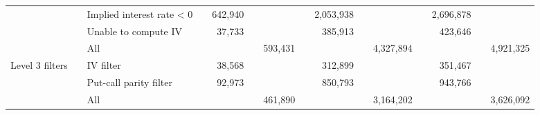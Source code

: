 \begin{tabular}{*{4}{l} *{11}{r} }
				  & & Implied interest rate < 0 & &
				642,940 & &  & &
				2,053,938 & &  & &
				2,696,878 & &  \\
			
				  & & Unable to compute IV & &
				37,733 & &  & &
				385,913 & &  & &
				423,646 & &  \\
			
				  & & All & &
				 & & 593,431 & &
				 & & 4,327,894 & &
				 & & 4,921,325 \\
			
				Level 3 filters & & IV filter & &
				38,568 & &  & &
				312,899 & &  & &
				351,467 & &  \\
			
				  & & Put-call parity filter & &
				92,973 & &  & &
				850,793 & &  & &
				943,766 & &  \\
			
				  & & All & &
				 & & 461,890 & &
				 & & 3,164,202 & &
				 & & 3,626,092 \\
			

	        \hline
	    \end{tabular}
	